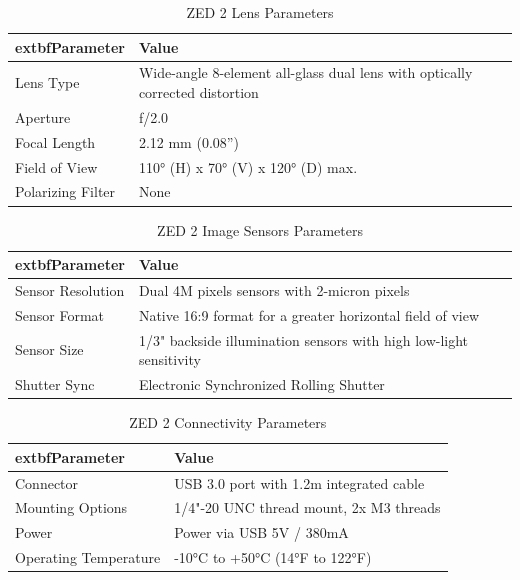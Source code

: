 \begin{table}[htbp]
	\centering
	\caption{ZED 2 Lens Parameters}
	\label{tab:zed2_lens}
	\begin{tabular}{|l|p{8cm}|}
		\hline
			extbf{Parameter} & \textbf{Value} \\
		\hline
		Lens Type & Wide-angle 8-element all-glass dual lens with optically corrected distortion \\
		\hline
		Aperture & ƒ/2.0 \\
		\hline
		Focal Length & 2.12 mm (0.08'') \\
		\hline
		Field of View & 110° (H) x 70° (V) x 120° (D) max. \\
		\hline
		Polarizing Filter & None \\
		\hline
	\end{tabular}
\end{table}
\begin{table}[htbp]
	\centering
	\caption{ZED 2 Image Sensors Parameters}
	\label{tab:zed2_image_sensors}
	\begin{tabular}{|l|p{8cm}|}
		\hline
			extbf{Parameter} & \textbf{Value} \\
		\hline
		Sensor Resolution & Dual 4M pixels sensors with 2-micron pixels \\
		\hline
		Sensor Format & Native 16:9 format for a greater horizontal field of view \\
		\hline
		Sensor Size & 1/3" backside illumination sensors with high low-light sensitivity \\
		\hline
		Shutter Sync & Electronic Synchronized Rolling Shutter \\
		\hline
	\end{tabular}
\end{table}
\begin{table}[htbp]
	\centering
	\caption{ZED 2 Connectivity Parameters}
	\label{tab:zed2_connectivity}
	\begin{tabular}{|l|p{8cm}|}
		\hline
			extbf{Parameter} & \textbf{Value} \\
		\hline
		Connector & USB 3.0 port with 1.2m integrated cable \\
		\hline
		Mounting Options & 1/4"-20 UNC thread mount, 2x M3 threads \\
		\hline
		Power & Power via USB 5V / 380mA \\
		\hline
		Operating Temperature & -10°C to +50°C (14°F to 122°F) \\
		\hline
	\end{tabular}
\end{table}

